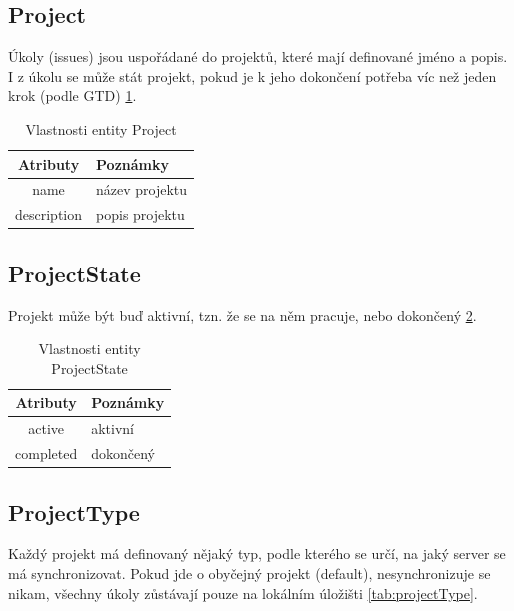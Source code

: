 \subsection{Project}
Úkoly (issues) jsou uspořádané do projektů, které mají definované jméno a popis. I z úkolu se může stát projekt, pokud je k jeho dokončení potřeba víc než jeden krok (podle GTD) \ref{tab:project}.

\begin{table}[h]
\begin{center}
	\begin{tabular}{|c|l|}
	\hline
	Atributy & Poznámky \\
	\hline
	name & název projektu \\
	description & popis projektu \\
	\hline
	\end{tabular}
\end{center}
\caption{Vlastnosti entity Project}
\label{tab:project}
\end{table}

\subsection{ProjectState}
Projekt může být buď aktivní, tzn. že se na něm pracuje, nebo dokončený \ref{tab:projectState}.

\begin{table}[h]
\begin{center}
	\begin{tabular}{|c|l|}
	\hline
	Atributy & Poznámky \\
	\hline
	active & aktivní \\
	completed & dokončený \\
	\hline
	\end{tabular}
\end{center}
\caption{Vlastnosti entity ProjectState}
\label{tab:projectState}
\end{table}

\subsection{ProjectType}

Každý projekt má definovaný nějaký typ, podle kterého se určí, na jaký server se má synchronizovat. Pokud jde o obyčejný projekt (default), nesynchronizuje se nikam, všechny úkoly zůstávají pouze na lokálním úložišti \ref{tab:projectType}.

